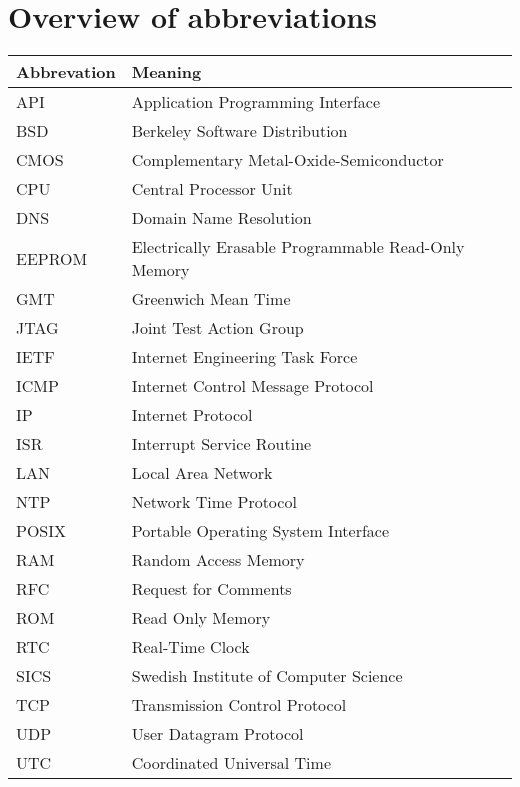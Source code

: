 \chapter{Overview of abbreviations}
\begin{tabular}{|l|l|l|}
	\hline
	Abbrevation & Meaning \\ \hline
	API & Application Programming Interface \\
	BSD & Berkeley Software Distribution \\
	CMOS & Complementary Metal-Oxide-Semiconductor \\
	CPU & Central Processor Unit \\
	DNS & Domain Name Resolution \\
	EEPROM & Electrically Erasable Programmable Read-Only Memory \\
	GMT & Greenwich Mean Time \\
	JTAG & Joint Test Action Group \\
	IETF & Internet Engineering Task Force \\
	ICMP & Internet Control Message Protocol \\
	IP & Internet Protocol \\
	ISR & Interrupt Service Routine \\
	LAN & Local Area Network \\
	NTP & Network Time Protocol \\
	POSIX & Portable Operating System Interface \\
	RAM & Random Access Memory \\
	RFC & Request for Comments \\
	ROM & Read Only Memory \\
	RTC & Real-Time Clock \\
	SICS & Swedish Institute of Computer Science \\
	TCP & Transmission Control Protocol \\
	UDP & User Datagram Protocol \\
	UTC & Coordinated Universal Time \\
	\hline
\end{tabular}
